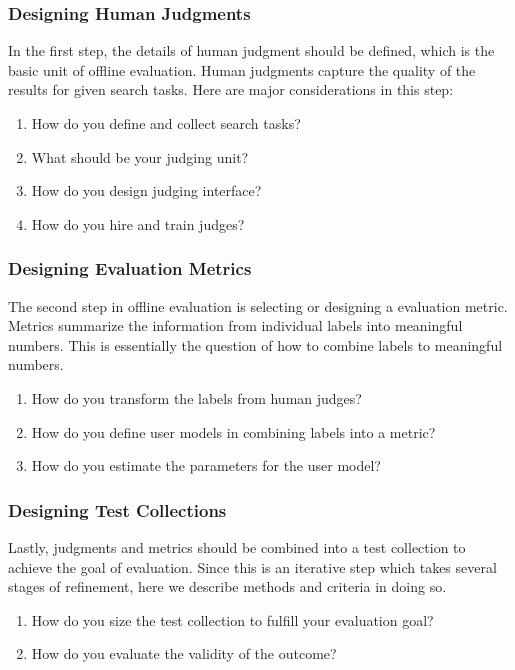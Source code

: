 \documentclass[openany]{now} %
\begin{document}
\subsubsection{Designing Human Judgments}

In the first step, the details of human judgment should be defined, which is the basic unit of offline evaluation. Human judgments capture the quality of the results for given search tasks. Here are major considerations in this step:

\begin{enumerate}
	\item How do you define and collect search tasks?
	\item What should be your judging unit?
	\item How do you design judging interface?
	\item How do you hire and train judges?
\end{enumerate}

\subsubsection{Designing Evaluation Metrics}

The second step in offline evaluation is selecting or designing a  evaluation metric. Metrics summarize the information from individual labels into meaningful numbers. This is essentially the question of how to combine labels to meaningful numbers.

\begin{enumerate}
	\item How do you transform the labels from human judges?
	\item How do you define user models in combining labels into a metric?
	\item How do you estimate the parameters for the user model?
\end{enumerate}

\subsubsection{Designing Test Collections}

Lastly, judgments and metrics should be combined into a test collection to achieve the goal of evaluation. Since this is an iterative step which takes several stages of refinement, here we describe methods and criteria in doing so. 

\begin{enumerate}
	\item How do you size the test collection to fulfill your evaluation goal?
	\item How do you evaluate the validity of the outcome?
\end{enumerate}
\end{document}
